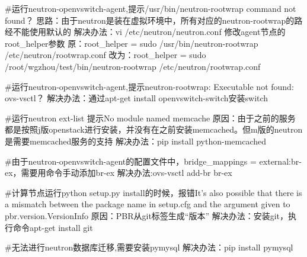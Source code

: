 \documentclass[a4paper,left=1.5cm,right=1.5cm,11pt]{article}
\begin{document}
\begin{itemize}
			#运行neutron-openvswitch-agent,提示/usr/bin/neutron-rootwrap command not found？
			思路：由于neutron是装在虚拟环境中，所有对应的neutron-rootwrap的路经不能使用默认的
			解决办法：vi /etc/neutron/neutron.conf 修改agent节点的root\_helper参数
			原：root\_helper = sudo /usr/bin/neutron-rootwrap /etc/neutron/rootwrap.conf
			改为：root\_helper = sudo /root/wgzhou/test/bin/neutron-rootwrap /etc/neutron/rootwrap.conf

			#运行neutron-openvswitch-agent,提示neutron-rootwrap: Executable not found: ovs-vsctl？
			解决办法：通过apt-get install openvswitch-switch安装switch

			#运行neutron ext-list 提示No module named memcache
			原因：由于之前的服务都是按照j版openstack进行安装，并没有在之前安装memcached。但m版的neutron是需要memcached服务的支持
			解决办法：pip install python-memcached

			#由于neutron-openvswitch-agent的配置文件中，bridge_mappings = external:br-ex，需要用命令手动添加br-ex
			解决办法:ovs-vsctl add-br br-ex

			#计算节点运行python setup.py install的时候，报错It's also possible that there is a mismatch between the package name in setup.cfg and the argument given to pbr.version.VersionInfo
		    原因：PBR从git标签生成“版本”
			解决办法：安装git，执行命令apt-get install git 

			#无法进行neutron数据库迁移,需要安装pymysql
			解决办法：pip install pymysql
		
    \end{itemize}
\end{document}

